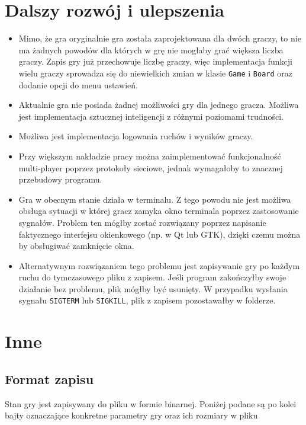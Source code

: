 \documentclass{article}
\begin{document}
\section{Dalszy rozwój i ulepszenia}

\begin{itemize}
    \item Mimo, że gra oryginalnie gra została zaprojektowana dla dwóch graczy, to nie ma żadnych powodów dla których
    w grę nie mogłaby grać większa liczba graczy. Zapis gry już przechowuje liczbę graczy, więc implementacja
    funkcji wielu graczy sprowadza się do niewielkich zmian w klasie \texttt{Game} i \texttt{Board} oraz dodanie
    opcji do menu ustawień.
    \item Aktualnie gra nie posiada żadnej możliwości gry dla jednego gracza. Możliwa jest implementacja sztucznej
    inteligencji z różnymi poziomami trudności.
    \item Możliwa jest implementacja logowania ruchów i wyników graczy.
    \item Przy większym nakładzie pracy można zaimplementować funkcjonalność multi-player poprzez protokoły sieciowe,
    jednak wymagałoby to znacznej przebudowy programu.
    \item Gra w obecnym stanie działa w terminalu. Z tego powodu nie jest możliwa obsługa sytuacji w której gracz
    zamyka okno terminala poprzez zastosowanie sygnałów. Problem ten mógłby zostać rozwiązany poprzez napisanie
    faktycznego interfejsu okienkowego (np. w Qt lub GTK), dzięki czemu można by obsługiwać zamknięcie okna.
    \item Alternatywnym rozwiązaniem tego problemu jest zapisywanie gry po każdym ruchu do tymczasowego pliku z zapisem.
    Jeśli program zakończyłby swoje działanie bez problemu, plik mógłby być usunięty. W przypadku wysłania sygnału 
    \texttt{SIGTERM} lub \texttt{SIGKILL}, plik z zapisem pozostawałby w folderze.
\end{itemize}

\section{Inne}

\subsection{Format zapisu}

Stan gry jest zapisywany do pliku w formie binarnej. Poniżej podane są po kolei bajty oznaczające konkretne parametry 
gry oraz ich rozmiary w pliku
\end{document}
